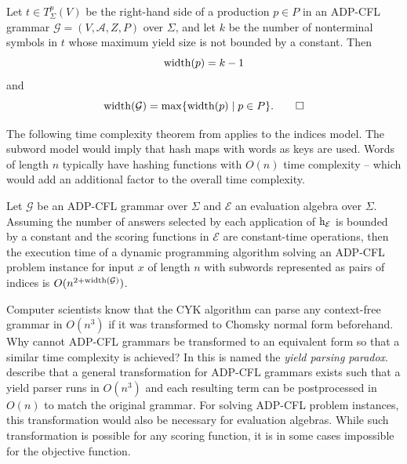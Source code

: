 \documentclass[
    a4paper,
    12pt,
    twoside,
    BCOR=12mm,
    parskip=half,
    chapterprefix,
    numbers=noenddot,
    bibliography=totoc
]{scrbook}
\begin{document}
\begin{definition}
	Let $t \in T^p_\Sigma(V)$ be the right-hand side of a production $p \in P$ in an ADP-CFL grammar $\mathcal{G}=(V,\mathcal{A},Z,P)$ over $\Sigma$, and let $k$ be the number of nonterminal symbols in $t$ whose maximum yield size is not bounded by a constant. Then 
  \[ \mathrm{width}(p) = k-1 \]
  and
  \[ \mathrm{width}(\mathcal{G}) = \max \{ \mathrm{width}(p) \mid p \in P \}. \qedhere \]
\end{definition}

The following time complexity theorem from \citet{giegerich_discipline_2004} applies to the indices model. The subword model would imply that hash maps with words as keys are used. Words of length $n$ typically have hashing functions with $O(n)$ time complexity -- which would add an additional factor to the overall time complexity.

\begin{theorem}
	\label{thm:adpcfl_runtime}
	Let $\mathcal{G}$ be an ADP-CFL grammar over $\Sigma$ and $\mathcal{E}$ an evaluation algebra over $\Sigma$. Assuming the number of answers selected by each application of $\mathrm{h}_\mathcal{E}$ is bounded by a constant and the scoring functions in $\mathcal{E}$ are constant-time operations, then the execution time of a dynamic programming algorithm solving an ADP-CFL problem instance for input $x$ of length $n$ with subwords represented as pairs of indices is $O(n^{2+\mathrm{width}(\mathcal{G})})$.
\end{theorem}

\begin{remark}
	Computer scientists know that the CYK algorithm can parse any context-free grammar in $O(n^3)$ if it was transformed to Chomsky normal form beforehand. Why cannot ADP-CFL grammars be transformed to an equivalent form so that a similar time complexity is achieved? In \citet{giegerich_implementing_2002} this is named the \emph{yield parsing paradox}. \citeauthor{giegerich_implementing_2002} describe that a general transformation for ADP-CFL grammars exists such that a yield parser runs in $O(n^3)$ and each resulting term can be postprocessed in $O(n)$ to match the original grammar. For solving ADP-CFL problem instances, this transformation would also be necessary for evaluation algebras. While such transformation is possible for any scoring function, it is in some cases impossible for the objective function.
\end{remark}
\end{document}
